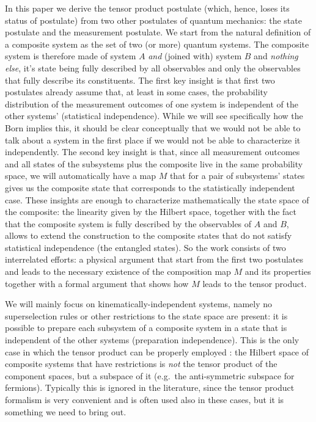 \documentclass[aps,prl,amsmath,amssymb,twocolumn,nofootinbib]{revtex4}
\theoremstyle{plain}
\theoremstyle{definition}
\theoremstyle{remark}
\begin{document}
	In this paper we derive the tensor product postulate (which, hence,
	loses its status of postulate) from two other postulates of quantum
	mechanics: the state postulate and the measurement postulate. We start
	from the natural definition of a composite system as the set of two
	(or more) quantum systems. The composite system is therefore
	made of system $A$ {\em and} (joined with) system $B$ and {\em nothing else},
	it's state being fully described by all observables and only the observables
	that fully describe its constituents. The first key insight is that first two postulates already assume that, at least in some cases, the probability distribution of the
	measurement outcomes of one system is independent of the other systems' (statistical independence). While we will see specifically how the Born implies this, it should be clear conceptually that we would not be able to talk about a system in the first place if we would not be able to characterize it independently. The second key insight is that, since all measurement
	outcomes and all states of the subsystems plus the composite live in the same probability space, we will automatically have a map $M$ that for a pair of subsystems' states gives us the composite state that corresponds to the statistically independent case. These insights are enough to characterize mathematically the state space of the composite: the linearity given by the Hilbert space, together with the fact that the composite system is fully described by the observables of $A$ and $B$, allows to extend the construction to the composite states that do not satisfy statistical independence (the entangled states). So the work consists of two interrelated efforts: a physical argument that start from the first two postulates and leads to the necessary existence of the composition map $M$ and its properties together with a formal argument that shows how $M$ leads to the tensor product.
	
	We will mainly focus on
	kine\-mati\-cal\-ly-inde\-pen\-dent systems, namely no superselection rules or
	other restrictions to the state space are present: it is possible to
	prepare each subsystem of a composite system in a state that is
	independent of the other systems (preparation independence).  This is
	the only case in which the tensor product can be properly employed
	\cite{susskind,zanardi,zanardilloyd}: the Hilbert space of composite
	systems that have restrictions is {\em not} the tensor product of the
	component spaces, but a subspace of it (e.g.~the anti-symmetric
	subspace for fermions). Typically this is ignored in the literature,
	since the tensor product formalism is very convenient and is often
	used also in these cases, but it is something we need to bring out.
	
\end{document}
